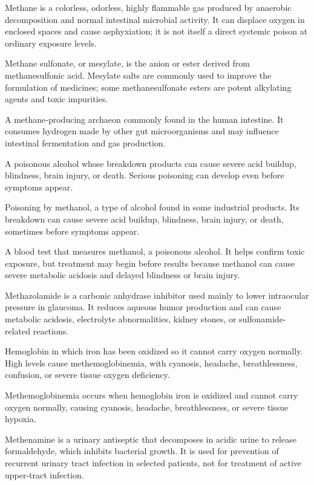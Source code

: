  Methane is a colorless, odorless, highly flammable gas produced by anaerobic decomposition and normal intestinal microbial activity. It can displace oxygen in enclosed spaces and cause asphyxiation; it is not itself a direct systemic poison at ordinary exposure levels.

 Methane sulfonate, or mesylate, is the anion or ester derived from methanesulfonic acid. Mesylate salts are commonly used to improve the formulation of medicines; some methanesulfonate esters are potent alkylating agents and toxic impurities.

 A methane-producing archaeon commonly found in the human intestine. It consumes hydrogen made by other gut microorganisms and may influence intestinal fermentation and gas production.

 A poisonous alcohol whose breakdown products can cause severe acid buildup, blindness, brain injury, or death. Serious poisoning can develop even before symptoms appear.

 Poisoning by methanol, a type of alcohol found in some industrial products. Its breakdown can cause severe acid buildup, blindness, brain injury, or death, sometimes before symptoms appear.

 A blood test that measures methanol, a poisonous alcohol. It helps confirm toxic exposure, but treatment may begin before results because methanol can cause severe metabolic acidosis and delayed blindness or brain injury.

 Methazolamide is a carbonic anhydrase inhibitor used mainly to lower intraocular pressure in glaucoma. It reduces aqueous humor production and can cause metabolic acidosis, electrolyte abnormalities, kidney stones, or sulfonamide-related reactions.

 Hemoglobin in which iron has been oxidized so it cannot carry oxygen normally. High levels cause methemoglobinemia, with cyanosis, headache, breathlessness, confusion, or severe tissue oxygen deficiency.

 Methemoglobinemia occurs when hemoglobin iron is oxidized and cannot carry oxygen normally, causing cyanosis, headache, breathlessness, or severe tissue hypoxia.

 Methenamine is a urinary antiseptic that decomposes in acidic urine to release formaldehyde, which inhibits bacterial growth. It is used for prevention of recurrent urinary tract infection in selected patients, not for treatment of active upper-tract infection.

